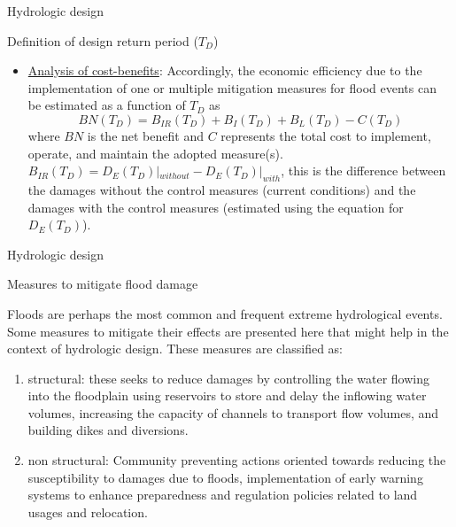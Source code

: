\documentclass[8pt]{beamer}
\renewcommand{\emph}[1]{\textcolor{myorange}{#1}}
\begin{document}
\begin{frame}{Hydrologic design}
   \begin{block}{Definition of design return period ($T_D$)}
   \end{block}
   \begin{itemize}
\item \emph{\underline{Analysis of cost-benefits}}:
          Accordingly, the economic efficiency due to the implementation of one or multiple mitigation measures for flood events can be estimated as a function of $T_D$ as
          \[
              BN (T_D) = B_{IR} (T_D) + B_{I} (T_D) + B_{L} (T_D) - C(T_D)
          \]
          where $BN$ is the \emph{net benefit} and $C$ represents the \emph{total cost} to implement, operate, and maintain the adopted measure(s). $B_{IR} (T_D) = D_E (T_D)|_{without} - D_E (T_D)|_{with} $, this is the difference between the damages without the control measures (current conditions) and the damages with the control measures (estimated using the equation for $D_E (T_D)$).
   \end{itemize}
\end{frame}

\begin{frame}{Hydrologic design}
    \begin{block}{Measures to mitigate flood damage}
   \end{block}
   \emph{Floods} are perhaps the most common and frequent extreme hydrological events. Some measures to mitigate their effects are presented here that might help in the context of hydrologic design. These measures are classified as:
   \begin{enumerate}
       \item \alert{structural}: these seeks to reduce damages by \emph{controlling the water flowing} into the floodplain using reservoirs to store and delay the inflowing water volumes, \emph{increasing the capacity of channels} to transport flow volumes, and \emph{building dikes and diversions}. 
       \item \alert{non structural}: Community preventing actions oriented towards \emph{reducing the susceptibility to damages} due to floods, implementation of \emph{early warning systems} to enhance preparedness and \emph{regulation policies} related to land usages and relocation. 
   \end{enumerate}
\end{frame}
\end{document}

